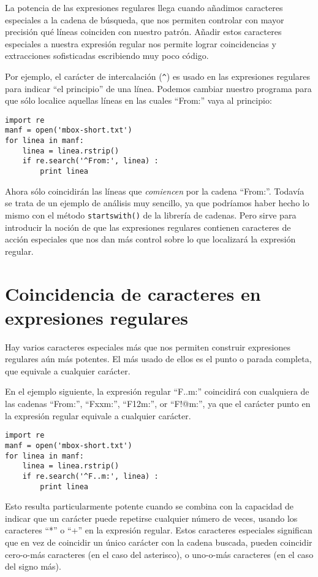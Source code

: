 La potencia de las expresiones regulares llega cuando añadimos caracteres especiales a la cadena de
búsqueda, que nos permiten controlar con mayor precisión qué líneas coinciden con nuestro patrón.
Añadir estos caracteres especiales a nuestra expresión regular nos permite lograr coincidencias y
extracciones sofisticadas escribiendo muy poco código.

Por ejemplo, el carácter de intercalación (\verb"^") es usado en las expresiones
regulares para indicar ``el principio'' de una línea.
Podemos cambiar nuestro programa para que sólo localice
aquellas líneas en las cuales ``From:'' vaya al principio:

\beforeverb
\begin{verbatim}
import re
manf = open('mbox-short.txt')
for linea in manf:
    linea = linea.rstrip()
    if re.search('^From:', linea) :
        print linea
\end{verbatim}
\afterverb
%
Ahora sólo coincidirán las líneas que {\em comiencen} por la cadena ``From:''. Todavía se trata
de un ejemplo de análisis muy sencillo, ya que podríamos haber hecho lo mismo con el método
{\tt startswith()} de la librería de cadenas. Pero sirve para introducir la noción de que las expresiones
regulares contienen caracteres de acción especiales que nos dan más control sobre lo que localizará
la expresión regular.

\section{Coincidencia de caracteres en expresiones regulares}

Hay varios caracteres especiales más que nos permiten construir expresiones regulares aún más potentes.
El más usado de ellos es el punto o parada completa, que equivale
a cualquier carácter.

En el ejemplo siguiente, la expresión regular ``F..m:'' coincidirá con cualquiera de las cadenas
``From:'', ``Fxxm:'', ``F12m:'', or ``F!@m:'', ya que el carácter punto en la expresión regular
equivale a cualquier carácter.

\beforeverb
\begin{verbatim}
import re
manf = open('mbox-short.txt')
for linea in manf:
    linea = linea.rstrip()
    if re.search('^F..m:', linea) :
        print linea
\end{verbatim}
\afterverb
%
Esto resulta particularmente potente cuando se combina con la capacidad de indicar que un carácter
puede repetirse cualquier número de veces, usando los caracteres ``*'' o ``+'' en la expresión regular.
Estos caracteres especiales significan que en vez de coincidir un único carácter con la cadena buscada,
pueden coincidir cero-o-más caracteres (en el caso del asterisco), o uno-o-más caracteres
(en el caso del signo más).

